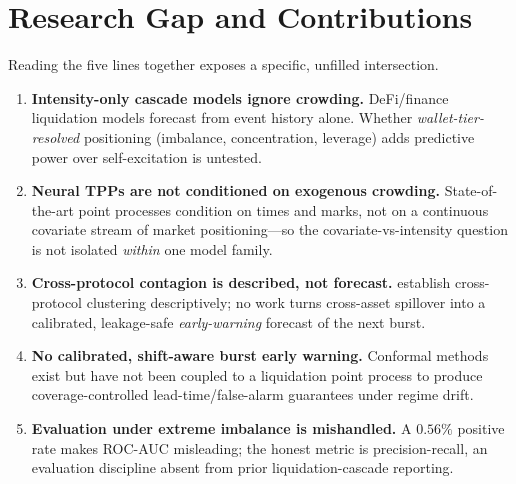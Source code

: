 \documentclass[11pt,a4paper]{article}
\begin{document}
\section{Research Gap and Contributions}
\label{sec:gap}

Reading the five lines together exposes a specific, unfilled intersection.

\begin{enumerate}[label=\textbf{G\arabic*:},leftmargin=*]
    \item \textbf{Intensity-only cascade models ignore crowding.} DeFi/finance liquidation models \citep{cao2025defi,bacry2015hawkes,hardiman2013endogeneity} forecast from event history alone. Whether \emph{wallet-tier-resolved} positioning (imbalance, concentration, leverage) adds predictive power over self-excitation is untested.
    \item \textbf{Neural TPPs are not conditioned on exogenous crowding.} State-of-the-art point processes \citep{zuo2020thp,mei2017neuralhawkes,du2016rmtpp} condition on times and marks, not on a continuous covariate stream of market positioning---so the covariate-vs-intensity question is not isolated \emph{within} one model family.
    \item \textbf{Cross-protocol contagion is described, not forecast.} \citet{cao2025defi} establish cross-protocol clustering descriptively; no work turns cross-asset spillover into a calibrated, leakage-safe \emph{early-warning} forecast of the next burst.
    \item \textbf{No calibrated, shift-aware burst early warning.} Conformal methods \citep{gibbs2021adaptive,zaffran2022adaptive} exist but have not been coupled to a liquidation point process to produce coverage-controlled lead-time/false-alarm guarantees under regime drift.
    \item \textbf{Evaluation under extreme imbalance is mishandled.} A $0.56\%$ positive rate makes ROC-AUC misleading; the honest metric is precision-recall, an evaluation discipline absent from prior liquidation-cascade reporting.
\end{enumerate}
\end{document}
